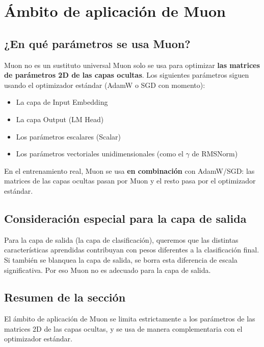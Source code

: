 \section{Ámbito de aplicación de Muon}

\subsection{¿En qué parámetros se usa Muon?}

\begin{warningbox}{Muon no es un sustituto universal}
Muon solo se usa para optimizar \textbf{las matrices de parámetros 2D de las capas ocultas}. Los siguientes parámetros siguen usando el optimizador estándar (AdamW o SGD con momento):
\begin{itemize}
  \item La capa de Input Embedding
  \item La capa Output (LM Head)
  \item Los parámetros escalares (Scalar)
  \item Los parámetros vectoriales unidimensionales (como el $\gamma$ de RMSNorm)
\end{itemize}
\end{warningbox}

En el entrenamiento real, Muon se usa \textbf{en combinación} con AdamW/SGD: las matrices de las capas ocultas pasan por Muon y el resto pasa por el optimizador estándar.

\subsection{Consideración especial para la capa de salida}

Para la capa de salida (la capa de clasificación), queremos que las distintas características aprendidas contribuyan con pesos diferentes a la clasificación final. Si también se blanquea la capa de salida, se borra esta diferencia de escala significativa. Por eso Muon no es adecuado para la capa de salida.

\subsection{Resumen de la sección}

El ámbito de aplicación de Muon se limita estrictamente a los parámetros de las matrices 2D de las capas ocultas, y se usa de manera complementaria con el optimizador estándar.

